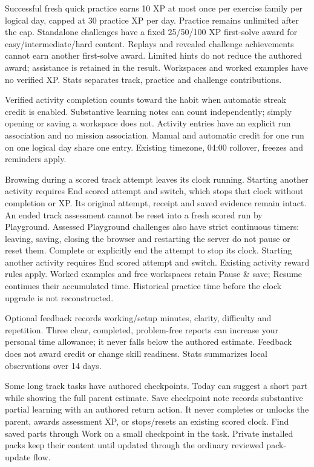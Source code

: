Successful fresh quick practice earns 10 XP at most once per exercise family per
logical day, capped at 30 practice XP per day. Practice remains unlimited after
the cap. Standalone challenges have a fixed 25/50/100 XP first-solve award for
easy/intermediate/hard content. Replays and revealed challenge achievements cannot
earn another first-solve award. Limited hints do not reduce the authored award;
assistance is retained in the result. Workspaces and worked examples have no
verified XP. Stats separates track, practice and challenge contributions.

Verified activity completion counts toward the habit when automatic streak credit
is enabled. Substantive learning notes can count independently; simply opening or
saving a workspace does not. Activity entries have an explicit run association and
no mission association. Manual and automatic credit for one run on one logical day
share one entry. Existing timezone, 04:00 rollover, freezes and reminders apply.

Browsing during a scored track attempt leaves its clock running. Starting another
activity requires End scored attempt and switch, which stops that clock without
completion or XP. Its original attempt, receipt and saved evidence remain intact.
An ended track assessment cannot be reset into a fresh scored run by Playground.
Assessed Playground challenges also have strict continuous timers: leaving,
saving, closing the browser and restarting the server do not pause or reset them.
Complete or explicitly end the attempt to stop its clock. Starting another
activity requires End scored attempt and switch. Existing activity reward rules
apply. Worked examples and free workspaces retain Pause \& save; Resume continues
their accumulated time. Historical practice time before the clock upgrade is not
reconstructed.

Optional feedback records working/setup minutes, clarity, difficulty and repetition.
Three clear, completed, problem-free reports can increase your personal time
allowance; it never falls below the authored estimate. Feedback does not award
credit or change skill readiness. Stats summarizes local observations over 14 days.

Some long track tasks have authored checkpoints. Today can suggest a short part
while showing the full parent estimate. Save checkpoint note records substantive
partial learning with an authored return action. It never completes or unlocks the
parent, awards assessment XP, or stops/resets an existing scored clock. Find saved
parts through Work on a small checkpoint in the task. Private installed packs keep
their content until updated through the ordinary reviewed pack-update flow.


